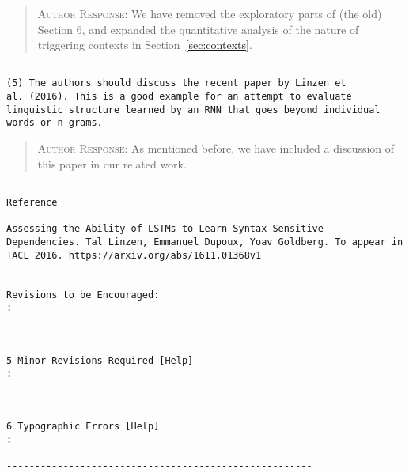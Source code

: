 \begin{quote}
\textsc{Author Response:}  We have removed the exploratory parts of (the old) Section 6, and expanded the quantitative analysis of the nature of triggering contexts in Section~\ref{sec:contexts}. 
\end{quote}
\begin{verbatim}

(5) The authors should discuss the recent paper by Linzen et
al. (2016). This is a good example for an attempt to evaluate
linguistic structure learned by an RNN that goes beyond individual
words or n-grams.
\end{verbatim}  
\begin{quote}
\textsc{Author Response:}  As mentioned before, we have included a discussion of
this paper in our related work.
\end{quote}
\begin{verbatim}

Reference

Assessing the Ability of LSTMs to Learn Syntax-Sensitive
Dependencies. Tal Linzen, Emmanuel Dupoux, Yoav Goldberg. To appear in
TACL 2016. https://arxiv.org/abs/1611.01368v1


Revisions to be Encouraged:
: 



5 Minor Revisions Required [Help]
: 



6 Typographic Errors [Help]
: 

------------------------------------------------------
\end{verbatim}